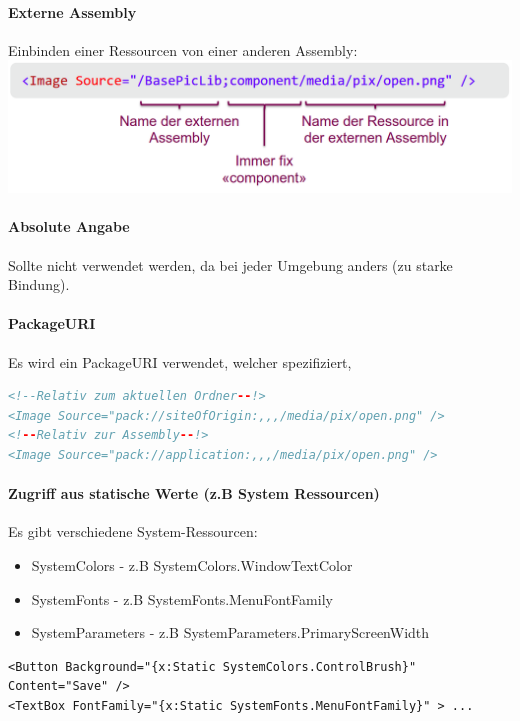 \paragraph{Externe Assembly}
Einbinden einer Ressourcen von einer anderen Assembly:
\includegraphics[scale=0.22]{img/ressource-other-assembly.png}

\paragraph{Absolute Angabe}
Sollte nicht verwendet werden, da bei jeder Umgebung anders (zu starke Bindung).

\paragraph{PackageURI}
Es wird ein PackageURI verwendet, welcher spezifiziert, 
\begin{lstlisting}[language=xml]
<!--Relativ zum aktuellen Ordner--!>
<Image Source="pack://siteOfOrigin:,,,/media/pix/open.png" />
<!--Relativ zur Assembly--!>
<Image Source="pack://application:,,,/media/pix/open.png" /> 
\end{lstlisting}

\paragraph{Zugriff aus statische Werte (z.B System Ressourcen)}
Es gibt verschiedene System-Ressourcen:
\begin{itemize}
    \item SystemColors - z.B SystemColors.WindowTextColor
    \item SystemFonts - z.B SystemFonts.MenuFontFamily
    \item SystemParameters - z.B SystemParameters.PrimaryScreenWidth
\end{itemize}
\begin{lstlisting}
<Button Background="{x:Static SystemColors.ControlBrush}" Content="Save" /> 
<TextBox FontFamily="{x:Static SystemFonts.MenuFontFamily}" > ... 
\end{lstlisting}

